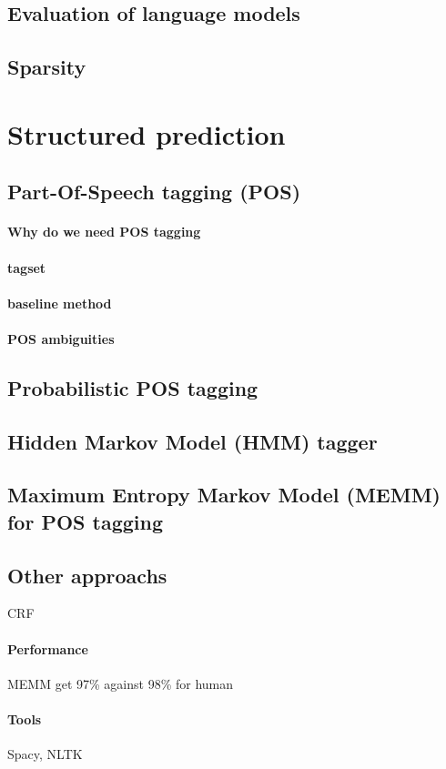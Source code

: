 			\subsection{Evaluation of language models}

			\subsection{Sparsity}

		\section{Structured prediction}

			\subsection{Part-Of-Speech tagging (POS)}

				\paragraph*{Why do we need POS tagging}

				\paragraph*{tagset}

				\paragraph*{baseline method}


				\paragraph*{POS ambiguities}
			\subsection{Probabilistic POS tagging}

			\subsection{Hidden Markov Model (HMM) tagger}

			\subsection{Maximum Entropy Markov Model (MEMM) for POS tagging}

			\subsection{Other approachs}
				CRF

			\paragraph*{Performance}
				MEMM get 97\% against 98\% for human

			\paragraph*{Tools}
				Spacy, NLTK


		

